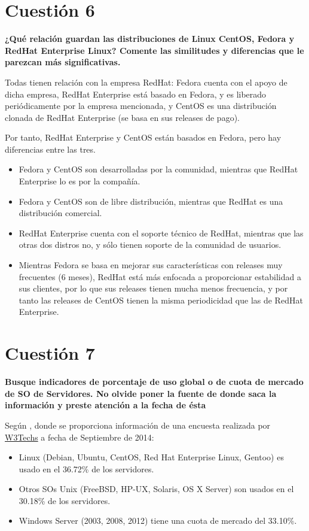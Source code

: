 \documentclass[a4paper,11pt]{article}
\newenvironment{answer}{%
\begin{list}{}{%
}%
\item[]}{\end{list}}
\begin{document}
\section{Cuestión 6}
\textbf{¿Qué relación guardan las distribuciones de Linux CentOS, Fedora y RedHat Enterprise Linux? Comente las 
similitudes y diferencias que le parezcan más significativas.}
\begin{answer}
Todas tienen relación con la empresa RedHat: Fedora cuenta con el apoyo de dicha empresa, RedHat Enterprise está basado
en Fedora, y es liberado periódicamente por la empresa mencionada, y CentOS es una distribución clonada de RedHat Enterprise
(se basa en sus releases de pago).

Por tanto, RedHat Enterprise y CentOS están basados en Fedora, pero hay diferencias entre las tres.
\begin{itemize}
 \item Fedora y CentOS son desarrolladas por la comunidad, mientras que RedHat Enterprise lo es por la compañía.
 \item Fedora y CentOS son de libre distribución, mientras que RedHat es una distribución comercial.
 \item RedHat Enterprise cuenta con el soporte técnico de RedHat, mientras que las otras dos distros no, y sólo tienen
 soporte de la comunidad de usuarios.
 \item Mientras Fedora se basa en mejorar sus características con releases muy frecuentes (6 meses), RedHat está más
 enfocada a proporcionar estabilidad a sus clientes, por lo que sus releases tienen mucha menos frecuencia, y por tanto
 las releases de CentOS tienen la misma periodicidad que las de RedHat Enterprise.
\end{itemize}

\cite{redhat}
\end{answer}

\section{Cuestión 7}
\textbf{Busque indicadores de porcentaje de uso global o de cuota de mercado de SO de Servidores. No olvide poner 
la fuente de donde saca la información y preste atención a la fecha de ésta}
\begin{answer}
  
Según \cite{quota}, donde se proporciona información de una encuesta realizada por \href{http://w3techs.com/}{W3Techs} a fecha de Septiembre de 2014:
\begin{itemize}
  \item Linux (Debian, Ubuntu, CentOS, Red Hat Enterprise Linux, Gentoo) es usado en el 36.72\% de los servidores.
  \item Otros SOs Unix (FreeBSD, HP-UX, Solaris, OS X Server) son usados en el 30.18\% de los servidores.
  \item Windows Server (2003, 2008, 2012) tiene una cuota de mercado del 33.10\%.
\end{itemize}
\end{answer}
\end{document}
